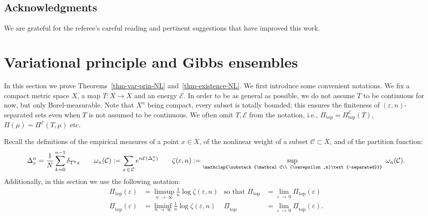 \documentclass[AHL, Unicode, longabstracts,published]{cedram}
\theoremstyle{plain}
\theoremstyle{plain}
\newcommand\eps{\varepsilon}
\newcommand\NLP{\Pi}
\renewcommand\top{{\mathrm{top}}}
\newcounter{In}
\newcommand*\8{\infty}
\newcommand{\En}{\mathcal{E}}
\newcommand{\cC}{\mathcal C}
\begin{document}
\subsection*{Acknowledgments}

We are grateful for the referee's careful reading and pertinent suggestions that have improved this work.



\section{Variational principle and Gibbs ensembles}\label{sec-th-AB}


In this section we prove Theorems~\ref{thm-var-prin-NL} and~\ref{thm-existence-NL}. We first introduce some convenient notations. We fix a compact metric space $X$, a map $T:X\to X$ and an energy $\En$. In order to be as general as possible, we do not assume $T$ to be continuous for now, but only Borel-measurable. Note that $X^n$ being compact, every subset is totally bounded; this ensures the finiteness of $(\eps,n)$-separated sets even when $T$ is not assumed to be continuous. We often omit $T,\En$ from the notation, i.e., $\NLP_\top = \NLP_\top^\En(T)$, $\NLP(\mu) = \NLP^\En(T,\mu)$ etc.


Recall the definitions of the empirical measures of a point $x\in X$, of the nonlinear weight of a subset $\cC\subset X$, and of the partition function:
\[
\Delta_x^n = \frac1N\sum_{k=0}^{n-1} \delta_{T^kx} \qquad
\omega_n(\cC) := \sum_{x\,\in\,\cC} e^{n\En(\Delta_x^n)} \qquad
\zeta(\eps,n) := \sup_{\mathclap{\substack{\cC \\ (\eps,n)\text{-separated}}}}\ \omega_n(\cC).
\]
Additionally, in this section we use the following notation:
\begin{align*}
\NLP_\top(\eps)&=\limsup_{n\,\to\,\infty} \frac1n \log \zeta(\eps,n) &
\text{so that }\NLP_\top &= \lim_{\eps\,\to\,0} \NLP_\top(\eps) \\
\underline{\NLP}_\top(\eps) &= \liminf_{n\,\to\,\infty} \frac1n \log \zeta(\eps,n) &\underline{\NLP}_\top &= \lim_{\eps\,\to\,0} \underline{\NLP}_\top(\eps).
\end{align*}


\end{document}
